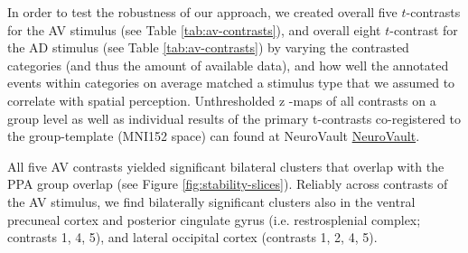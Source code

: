 \documentclass[english]{article}
\begin{document}
In order to test the robustness of our approach, we created overall five
$t$-contrasts for the AV stimulus (see Table \ref{tab:av-contrasts}), and
overall eight $t$-contrast for the AD stimulus (see Table
\ref{tab:av-contrasts}) by varying the contrasted categories (and thus the
amount of available data), and how well the annotated events within categories
on average matched a stimulus type that we assumed to correlate with spatial
perception.
Unthresholded z -maps of all contrasts on a group level as well as individual
results of the primary t-contrasts co-registered to the group-template (MNI152
space) can found at NeuroVault
\href{https://neurovault.org/collections/KADGMGVZ/}{NeuroVault}.


All five AV contrasts yielded significant bilateral clusters that
overlap with the PPA group overlap (see Figure \ref{fig:stability-slices}).
Reliably across contrasts of the AV stimulus, we find bilaterally
significant clusters also in the ventral precuneal cortex and posterior
cingulate gyrus (i.e. restrosplenial complex; contrasts 1, 4, 5), and lateral
occipital cortex (contrasts 1, 2, 4, 5).

\end{document}
